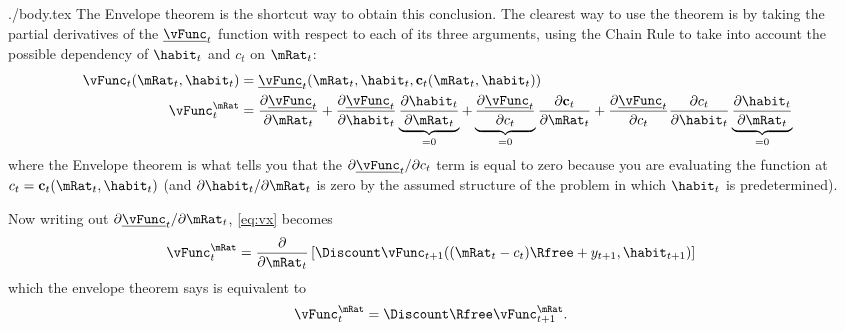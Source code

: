 \documentclass{handout}
\begin{document}
\begin{verbatimwrite}{./body.tex}
The Envelope theorem is the shortcut way to obtain this conclusion.  The
clearest way to use the theorem is by taking the partial derivatives
of the $\underline{\vFunc}_{t}$ function with respect to each of its three arguments,
using the Chain Rule to take into account the possible dependency of 
$\habit_{t}$ and $c_{t}$ on $\mRat_{t}$:
\begin{equation}\begin{gathered}\begin{aligned}
        \vFunc_{t}(\mRat_{t},\habit_{t}) & =  \underline{\vFunc}_{t}(\mRat_{t},\habit_{t},\mathbf{c}_{t}(\mRat_{t},\habit_{t}))  \\
        \vFunc_{t}^{\mRat} & =  \frac{\partial \underline{\vFunc}_{t}}{\partial \mRat_{t}} 
        + \frac{\partial \underline{\vFunc}_{t}}{\partial \habit_{t}}\underbrace{\frac{\partial \habit_{t}}{\partial \mRat_{t}}}_{=0}
        + \underbrace{\frac{\partial \underline{\vFunc}_{t}}{\partial c_{t}}}_{=0}\frac{\partial \mathbf{c}_{t}}{\partial \mRat_{t}}+\frac{\partial \underline{\vFunc}_{t}}{\partial c_{t}}\frac{\partial c_{t}}{\partial \habit_{t}}\underbrace{\frac{\partial \habit_{t}}{\partial \mRat_{t}}}_{=0} \label{eq:vx}
\end{aligned}\end{gathered}\end{equation}
where the Envelope theorem is what tells you that the $\partial
\underline{\vFunc}_{t}/\partial c_{t}$ term is equal to zero because you are
evaluating the function at $c_{t}=\mathbf{c}_{t}(\mRat_{t},\habit_{t})$ (and
$\partial \habit_{t}/\partial \mRat_{t}$ is zero by the assumed structure of
the problem in which $\habit_{t}$ is predetermined).

Now writing out $\partial \underline{\vFunc}_{t}/\partial \mRat_{t}$, \eqref{eq:vx}
becomes
\begin{equation}\begin{gathered}\begin{aligned}
\vFunc^{\mRat}_{t} & =  \frac{\partial}{\partial \mRat_{t}}\left[\Discount \vFunc_{t+1}((\mRat_{t}-c_{t})\Rfree+y_{t+1},\habit_{t+1})\right]
                  \label{eq:partialx}
\end{aligned}\end{gathered}\end{equation}
which the envelope theorem says is equivalent to
\begin{equation}\begin{gathered}\begin{aligned}
\vFunc^{\mRat}_{t} & =  \Discount  \Rfree \vFunc_{t+1}^{\mRat}. \label{eq:envelopex}
\end{aligned}\end{gathered}\end{equation}


\end{verbatimwrite}
\end{document}
